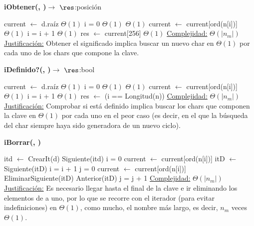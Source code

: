 \begin{Algoritmos}
\begin{algorithm}[H]{\textbf{iObtener(, )}}{$\to$ $\res$:{posición}}
	\begin{algorithmic}
 	\State current $\gets$ d.raíz 			\Comment $\Theta(1)$
    \State i = 0							\Comment $\Theta(1)$
    				\Comment $\Theta(1)$
    	\State current $\gets$ current[ord(n[i])] \Comment $\Theta(1)$
        \State i = i + 1						\Comment $\Theta(1)$
    \EndWhile
    \State res $\gets$ current[256] \Comment $\Theta(1)$
  	\Statex \underline{Complejidad:} $\Theta(|n_{m}|)$
    \Statex \underline{Justificación:} Obtener el significado implica buscar un nuevo char en $\Theta(1)$ por cada uno de los chars que compone la clave.
	\end{algorithmic}
\end{algorithm}

\begin{algorithm}[H]{\textbf{iDefinido?(, )}}{$\to$ $\res$:{bool}}
	\begin{algorithmic}
	\State current $\gets$ d.raíz 			\Comment $\Theta(1)$
    \State i = 0							\Comment $\Theta(1)$
    				\Comment $\Theta(1)$
    	\State current $\gets$ current[ord(n[i])] \Comment $\Theta(1)$
        \State i = i + 1						\Comment $\Theta(1)$
    \EndWhile
    \State res $\gets$ (i == Longitud(n))
    \Statex \underline{Complejidad:} $\Theta(|n_{m}|)$
    \Statex \underline{Justificación:} Comprobar si está definido implica buscar los chars que componen la clave en $\Theta(1)$ por cada uno en el peor caso (es decir, en el que la búsqueda del char siempre haya sido generadora de un nuevo ciclo).
	\end{algorithmic}
\end{algorithm}

\begin{algorithm}[H]{\textbf{iBorrar(, )}}
	\begin{algorithmic} 
    \State itd $\gets$ CrearIt(d)
    \State Siguiente(itd)
    \State i = 0
    \State current $\gets$ current[ord(n[i])]
    \State itD $\gets$ Siguiente(itD)
    \State i = i + 1 
    \EndWhile
    \State j = 0
    \State current $\gets$ current[ord(n[i])]
    \State EliminarSiguiente(itD)
    \State Anterior(itD)
    \State j = j + 1 
    \EndWhile 
    \Statex \underline{Complejidad:} $\Theta(|n_{m}|)$
    \Statex \underline{Justificación:} Es necesario llegar hasta el final de la clave e ir eliminando los elementos de a uno, por lo que se recorre con el iterador (para evitar indefiniciones) en $\Theta(1)$, como mucho, el nombre más largo, es decir, $n_{m}$ veces $\Theta(1)$.
	\end{algorithmic}
\end{algorithm}


\end{Algoritmos}
